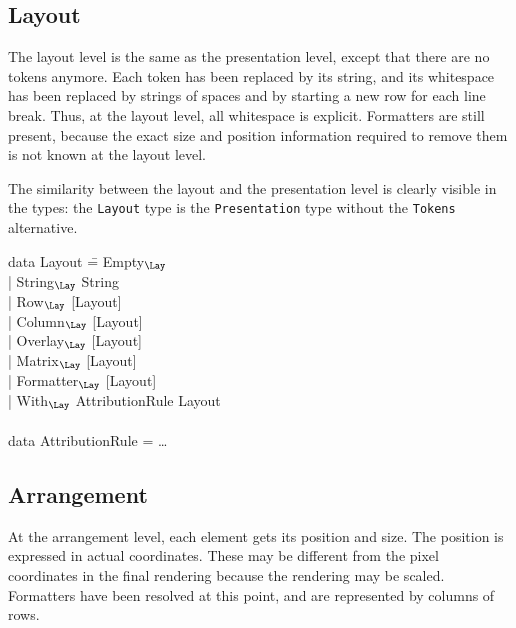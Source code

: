 %																
\subsection{Layout}

The layout level is the same as the presentation level, except that there are no tokens anymore. Each token has been replaced by its string, and its whitespace has been replaced by strings of spaces and by starting a new row for each line break. Thus, at the layout level, all whitespace is explicit. Formatters are still present, because the exact size and position information required to remove them is not known at the layout level.

The similarity between the layout and the presentation level is clearly visible in the types: the {\tt Layout} type is the {\tt Presentation} type without the {\tt Tokens} alternative.

\noindent
\ttfamily
\begin{tabbing}
data Layout \= = Empty$_{\Lay}$\\
            \> | String$_{\Lay}$ String \\
            \> | Row$_{\Lay}$ [Layout]\\
            \> | Column$_{\Lay}$ [Layout]\\
            \> | Overlay$_{\Lay}$ [Layout]\\
            \> | Matrix$_{\Lay}$ [Layout]\\
            \> | Formatter$_{\Lay}$ [Layout]\\
            \> | With$_{\Lay}$ AttributionRule Layout\\
\\
data AttributionRule = \dots\\
\end{tabbing}
\rmfamily


%																
\subsection{Arrangement}

At the arrangement level, each element gets its position and size. The position is expressed in actual coordinates. These may be different from the pixel coordinates in the final rendering because the rendering may be scaled. Formatters have been resolved at this point, and are represented by columns of rows.

